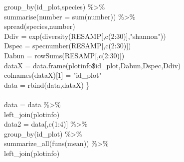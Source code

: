 \documentclass[b5paper,10pt]{book} %
\begin{document}
\begin{scriptsize}
\begin{tt}
  group\_by(id\_plot,species) \%\textgreater\%  \\
  summarise(number = sum(number)) \%\textgreater\%  \\
  spread(species,number)  \\
Ddiv = exp(diversity(RESAMP[,c(2:30)],"shannon"))  \\
Dspec = specnumber(RESAMP[,c(2:30)])  \\
Dabun = rowSums(RESAMP[,c(2:30)])  \\
dataX = data.frame(plotinfo\$id\_plot,Dabun,Dspec,Ddiv)  \\
colnames(dataX)[1] = "id\_plot"  \\
data = rbind(data,dataX)      \}  \\
 \\
data = data \%\textgreater\%  \\
  left\_join(plotinfo)  \\
data2 = data[,c(1:4)] \%\textgreater\%  \\
  group\_by(id\_plot) \%\textgreater\%  \\
  summarize\_all(funs(mean)) \%\textgreater\%  \\
  left\_join(plotinfo)  
 \end{tt} \end{scriptsize} 
 
\end{document}
